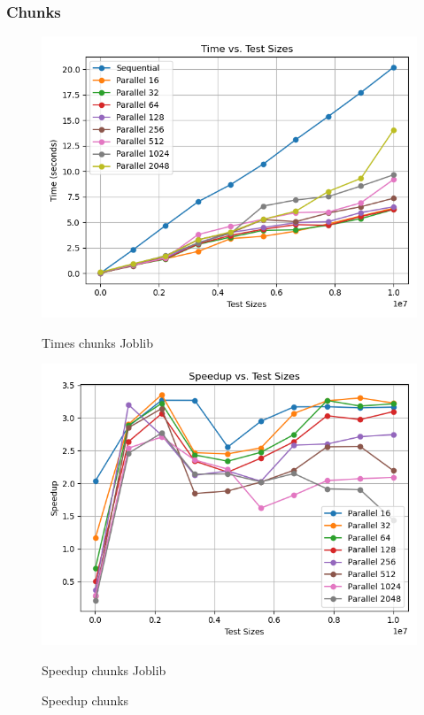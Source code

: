 \documentclass[11pt]{article}
\begin{document}
    \subsubsection{Chunks}\label{subsubsec:chunks}
    \begin{figure}[H]
        \centering
        \includegraphics[width=\linewidth]{joblib/001/chunks_time_plot}
            \caption{Times chunks Joblib}\label{fig:chunks_time_joblib}
        \endminipage\hfill
        \includegraphics[width=\linewidth]{joblib/001/chunks_speedup_plot}
            \caption{Speedup chunks Joblib}\label{fig:chunks_speedup_joblib}
        \endminipage\hfill
        \caption{Speedup chunks}
    \end{figure}
\end{document}
